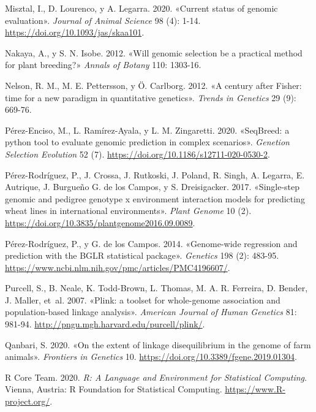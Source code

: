\documentclass[11pt,spanish,a4paper,oneside,]{book} %
\begin{document}
\leavevmode\hypertarget{ref-cite:18}{}%
Misztal, I., D. Lourenco, y A. Legarra. 2020. «Current status of genomic evaluation». \emph{Journal of Animal Science} 98 (4): 1-14. \url{https://doi.org/10.1093/jas/skaa101}.

\leavevmode\hypertarget{ref-cite:6}{}%
Nakaya, A., y S. N. Isobe. 2012. «Will genomic selection be a practical method for plant breeding?» \emph{Annals of Botany} 110: 1303-16.

\leavevmode\hypertarget{ref-cite:2}{}%
Nelson, R. M., M. E. Pettersson, y Ö. Carlborg. 2012. «A century after Fisher: time for a new paradigm in quantitative genetics». \emph{Trends in Genetics} 29 (9): 669-76.

\leavevmode\hypertarget{ref-cite:47}{}%
Pérez-Enciso, M., L. Ramírez-Ayala, y L. M. Zingaretti. 2020. «SeqBreed: a python tool to evaluate genomic prediction in complex scenarios». \emph{Genetion Selection Evolution} 52 (7). \url{https://doi.org/10.1186/s12711-020-0530-2}.

\leavevmode\hypertarget{ref-cite:19}{}%
Pérez-Rodríguez, P., J. Crossa, J. Rutkoski, J. Poland, R. Singh, A. Legarra, E. Autrique, J. Burgueño G. de los Campos, y S. Dreisigacker. 2017. «Single-step genomic and pedigree genotype x environment interaction models for predicting wheat lines in international environments». \emph{Plant Genome} 10 (2). \url{https://doi.org/10.3835/plantgenome2016.09.0089}.

\leavevmode\hypertarget{ref-cite:50}{}%
Pérez-Rodríguez, P., y G. de los Campos. 2014. «Genome-wide regression and prediction with the BGLR statistical package». \emph{Genetics} 198 (2): 483-95. \url{https://www.ncbi.nlm.nih.gov/pmc/articles/PMC4196607/}.

\leavevmode\hypertarget{ref-cite:49}{}%
Purcell, S., B. Neale, K. Todd-Brown, L. Thomas, M. A. R. Ferreira, D. Bender, J. Maller, et~al. 2007. «Plink: a toolset for whole-genome association and population-based linkage analysis». \emph{American Journal of Human Genetics} 81: 981-94. \url{http://pngu.mgh.harvard.edu/purcell/plink/}.

\leavevmode\hypertarget{ref-cite:36}{}%
Qanbari, S. 2020. «On the extent of linkage disequilibrium in the genome of farm animals». \emph{Frontiers in Genetics} 10. \url{https://doi.org/10.3389/fgene.2019.01304}.

\leavevmode\hypertarget{ref-cite:52}{}%
R Core Team. 2020. \emph{R: A Language and Environment for Statistical Computing}. Vienna, Austria: R Foundation for Statistical Computing. \url{https://www.R-project.org/}.
\end{document}
